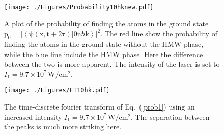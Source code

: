 \begin{figure}[htp]
\texttt{[image: ./Figures/Probability10hknew.pdf]}
\caption{A plot of the probability of finding the atoms in the ground state $\mathrm{p_0=|\left<\psi(x,t+2\tau)|0n\hbar k\right>|^2}$. The red line show the probability of finding the atoms in the ground state without the HMW phase, while the blue line include the HMW phase. Here the difference between the two is more apparent. The intensity of the laser is set to $I_1=9.7\times 10^7\, \mathrm{W/cm^2}$.} 
\label{fig:prob10}
\end{figure}
\begin{figure}[htp]
\texttt{[image: ./Figures/FT10hk.pdf]}
\caption{The time-discrete fourier transform of Eq.\ (\ref{prob1}) using an increased intensity $I_1=9.7\times 10^7\, \mathrm{W/cm^2}$.  The separation between the peaks is much more striking here.} 
\label{fig:ft10hk}
\end{figure}





\newpage
